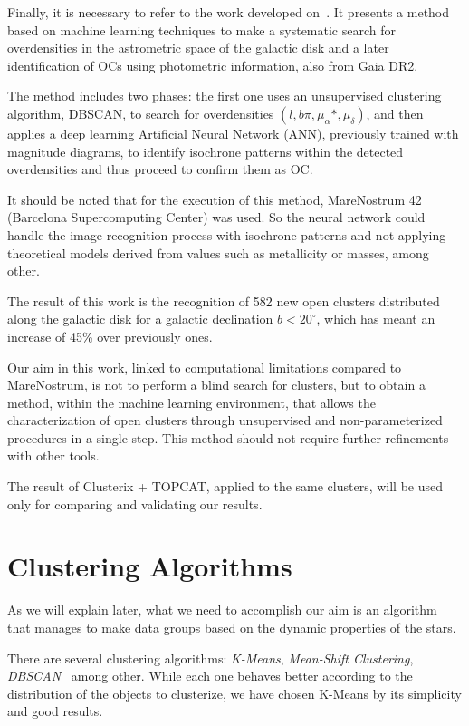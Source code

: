 \documentclass[11pt, a4paper, english]{book}
\begin{document}
Finally, it is necessary to refer to the work developed on~\cite{castro2020hunting}.
It presents a method based on machine learning techniques to make a systematic search
for overdensities in the astrometric space of the galactic disk
and a later identification of OCs using photometric information, also from Gaia DR2.

The method includes two phases: the first one uses an unsupervised clustering algorithm, DBSCAN,
to search for overdensities \((l, b \pi, \mu_{\alpha} *, \mu_{\delta})\),
and then applies a deep learning Artificial Neural Network (ANN),
previously trained with magnitude diagrams,
to identify isochrone patterns within the detected overdensities and thus proceed to confirm them as OC.

It should be noted that for the execution of this method,
MareNostrum 42 (Barcelona Supercomputing Center) was used.
So the neural network could handle the image recognition process with isochrone patterns
and not applying theoretical models derived from values such as metallicity or masses, among other.

The result of this work is the recognition of 582 new open clusters
distributed along the galactic disk for a galactic declination \(b < 20^{\circ}\),
which has meant an increase of 45\% over previously ones.

Our aim in this work, linked to computational limitations compared to MareNostrum,
is not to perform a blind search for clusters, but to obtain a method, within the machine learning environment,
that allows the characterization of open clusters through unsupervised and non-parameterized procedures in a single step.
This method should not require further refinements with other tools.

The result of Clusterix + TOPCAT, applied to the same clusters,
will be used only for comparing and validating our results.

\section{Clustering Algorithms}

As we will explain later, what we need to accomplish our aim is an algorithm
that manages to make data groups based on the dynamic properties of the stars.

There are several clustering algorithms: \emph{K-Means}, \emph{Mean-Shift Clustering}, \emph{DBSCAN}~\cite{ester1996density} among other.
While each one behaves better according to the distribution of the objects to clusterize,
we have chosen K-Means by its simplicity and good results.
\end{document}
